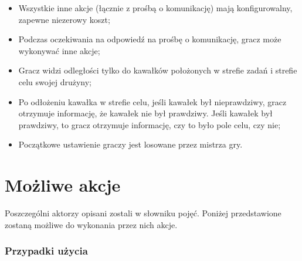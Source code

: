 \documentclass[a4paper]{article}
\begin{document}
\begin{itemize}
\item
  Wszystkie inne akcje (łącznie z prośbą o komunikację) mają konfigurowalny, zapewne niezerowy koszt;
\item
  Podczas oczekiwania na odpowiedź na prośbę o komunikację, gracz może wykonywać inne akcje;
\item
  Gracz widzi odległości tylko do kawałków położonych w strefie zadań i strefie celu swojej drużyny;
\item
  Po odłożeniu kawałka w strefie celu, jeśli kawałek był nieprawdziwy, gracz otrzymuje informację, że kawałek nie był prawdziwy. Jeśli kawałek był prawdziwy, to gracz otrzymuje informację, czy to było pole celu, czy nie;
\item
  Początkowe ustawienie graczy jest losowane przez mistrza gry.
\end{itemize}

\section{Możliwe akcje}

Poszczególni aktorzy opisani zostali w słowniku pojęć.
Poniżej przedstawione zostaną możliwe do wykonania przez nich akcje.

\subsubsection{Przypadki użycia}
\end{document}
